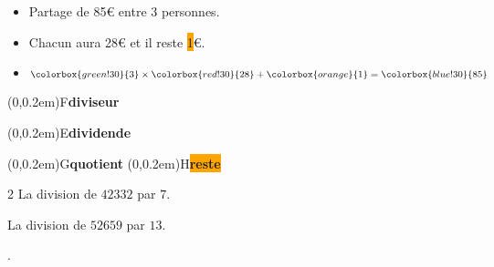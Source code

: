 \begin{exemple*1}
	\phantom{rrr}
	
	\begin{minipage}{0.5\linewidth}
		\begin{itemize}
			\item Partage de 85\euro{} entre 3 personnes.
			\item Chacun aura \colorbox{red!30}{28}\euro{} et il reste \colorbox{orange}{1}\euro{}.
			\item $\colorbox{green!30}{3}\times \colorbox{red!30}{28}+ \colorbox{orange}{1}=\colorbox{blue!30}{85}$
		\end{itemize}
	\end{minipage}
	\begin{minipage}{0.5\linewidth}
		\begin{center}
			\qquad
			\begin{minipage}[b]{2cm}
				\pnode(0,0.2em){F}{\colorbox{green!30}{\textbf{diviseur}}}
					\par
				\pnode(0,0.2em){E}{\colorbox{blue!30}{\textbf{dividende}}}
				\par
				\pnode(0,0.2em){G}{\colorbox{red!30}{\textbf{quotient}}}
				\pnode(0,0.2em){H}{\colorbox{orange}{\textbf{reste}}}
			\end{minipage}
		\end{center}
	\end{minipage}
\end{exemple*1}

\begin{exemple*1}
	\begin{multicols}2
	La division de $\num{42332}$ par $7$.

	\medskip
	\begin{center}
	\end{center}
	\columnbreak
	La division de $\num{52659}$ par $13$.

	\medskip
	\begin{center}
		.
	\end{center}
\end{multicols}
\end{exemple*1}

